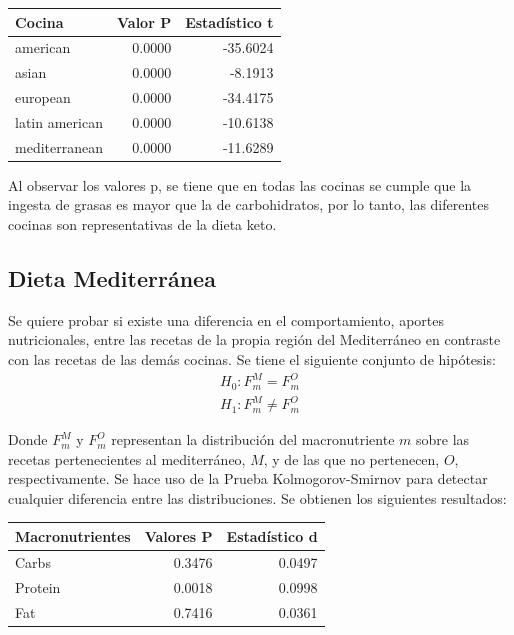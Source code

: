 \documentclass[12pt,a4paper]{article}
\begin{document}
{{            \begin{center}
                \begin{tabular}{lrr}
                \toprule
                    Cocina & Valor P & Estadístico t \\
                \midrule
                    american       & 0.0000 & -35.6024 \\
                    asian          & 0.0000 &  -8.1913 \\
                    european       & 0.0000 & -34.4175 \\
                    latin american & 0.0000 & -10.6138 \\
                    mediterranean  & 0.0000 & -11.6289 \\
                \bottomrule
                \end{tabular}
            \end{center}

            Al observar los valores p, se tiene que en todas las cocinas se cumple 
            que la ingesta de grasas es mayor que la de carbohidratos, por lo 
            tanto, las diferentes cocinas son representativas de la dieta keto.
        }

        \subsection{Dieta Mediterránea}

        {
            Se quiere probar si existe una diferencia en el comportamiento, aportes 
            nutricionales, entre las recetas de la propia región del Mediterráneo en contraste 
            con las recetas de las demás cocinas. Se tiene el siguiente conjunto de hipótesis:
            \begin{align*}
                H_0 : F^M_m = F^O_m \\
                H_1 : F^M_m \ne F^O_m  
            \end{align*}

            Donde $F^M_m$ y $F^O_m$ representan la distribución del macronutriente $m$ sobre las 
            recetas pertenecientes al mediterráneo, $M$, y de las que no pertenecen, $O$, respectivamente. 
            Se hace uso de la Prueba Kolmogorov-Smirnov para detectar cualquier diferencia entre las distribuciones.
            Se obtienen los siguientes resultados:

            \begin{center}
                \begin{tabular}{lrr}
                \toprule
                    Macronutrientes & Valores P & Estadístico d \\
                \midrule
                    Carbs   & 0.3476 & 0.0497 \\
                    Protein & 0.0018 & 0.0998 \\
                    Fat     & 0.7416 & 0.0361 \\
                \bottomrule
                \end{tabular}
            \end{center}
            
}}
\end{document}
